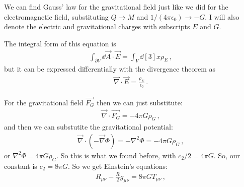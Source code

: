 \documentclass[main.tex]{subfiles}
\begin{document}
We can find Gauss' law for the gravitational field just like we did for the electromagnetic field, substituting \(Q \rightarrow M\) and \(1 / (4 \pi \epsilon_{0}) \rightarrow -G\).
I will also denote the electric and gravitational charges with subscripts \(E\) and \(G\).

The integral form of this equation is 
%
\begin{align}
  \int _{\partial V} \dd{\vec{A}} \cdot \vec{E} = \int_V \dd[3]{x} \rho_E
\,,
\end{align}
%
but it can be expressed differentially with the divergence theorem as 
%
\begin{align}
  \vec{\nabla} \cdot \vec{E} = \frac{\rho_E}{\epsilon_0 }
\,.
\end{align}

For the gravitational field \(\vec{F_G}\) then we can just substitute: 
%
\begin{align}
  \vec{\nabla} \cdot \vec{F_G} = - 4 \pi G \rho_G
\,,
\end{align}
%
and then we can substutite the gravitational potential: 
%
\begin{align}
  \vec{\nabla} \cdot ( - \vec{\nabla} \Phi ) = - \nabla^2 \Phi  = - 4 \pi G \rho_G
\,,
\end{align}
%
or \(\nabla^2 \Phi = 4 \pi G \rho_G\).
So this is what we found before, with \(c_2/2 = 4 \pi G \).
So, our constant is \(c_2 = 8 \pi G\). So we get Einstein's equations: 
%
\begin{align}
  R_{\mu \nu } - \frac{R}{2} g_{\mu \nu } = 8 \pi G T_{\mu \nu }
\,,
\end{align}
\end{document}
